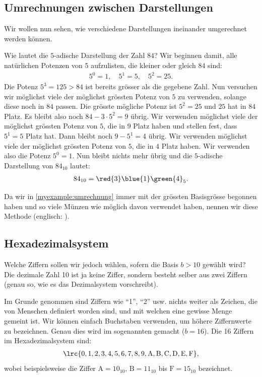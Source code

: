 \subsection{Umrechnungen zwischen Darstellungen}
Wir wollen nun sehen, wie verschiedene Darstellungen ineinander umgerechnet werden können.
\begin{myexample}\label{myexample:umrechnung}
Wie lautet die $5$-adische Darstellung der Zahl $84$? Wir beginnen damit, alle natürlichen Potenzen von $5$
aufzulisten, die kleiner oder gleich $84$ sind:
\begin{align*}
	5^0 = 1, \quad 5^1 = 5, \quad 5^2 = 25.
\end{align*}
Die Potenz $5^3 = 125 > 84$ ist bereits grösser als die gegebene Zahl. Nun versuchen wir möglichst viele der möglichst
grössten Potenz von $5$ zu verwenden, solange diese noch in $84$ passen. Die grösste mögliche Potenz ist $5^2 = 25$ und
$25$ hat  in $84$ Platz. Es bleibt also noch $84-3\cdot 5^2 = 9$ übrig. Wir verwenden möglichst viele der
möglichst grössten Potenz von $5$, die in $9$ Platz haben und stellen fest, dass $5^1=5$  Platz hat. Dann
bleibt noch $9-5^1 = 4$ übrig. Wir verwenden möglichst viele der möglichst grössten Potenz von $5$, die in $4$ Platz
haben. Wir verwenden also  die Potenz $5^0 = 1$. Nun bleibt nichts mehr übrig und die $5$-adische
Darstellung von $84_{10}$ lautet:
\begin{align*}
	84_{10} = \red{3}\blue{1}\green{4}_5.
\end{align*}
\end{myexample}
Da wir in \cref{myexample:umrechnung} immer mit der grössten Basisgrösse begonnen haben und so viele Münzen wie möglich
davon verwendet haben, nennen wir diese Methode  (englisch: ).

\subsection{Hexadezimalsystem}

Welche Ziffern sollen wir jedoch wählen, sofern die Basis $b > 10$ gewählt wird? Die dezimale Zahl 10 ist ja keine Ziffer, sondern besteht selber aus zwei Ziffern (genau so, wie es das Dezimalsystem vorschreibt).

Im Grunde genommen sind Ziffern wie \enquote{1}, \enquote{2} usw. nichts weiter als Zeichen, die von Menschen definiert worden sind, und mit welchen eine gewisse Menge gemeint ist. Wir können einfach Buchstaben verwenden, um höhere Ziffernwerte zu bezeichnen. Genau dies wird im sogenannten  gemacht ($b=16$). Die 16 Ziffern im Hexadezimalsystem sind:
\begin{align*}
	\lrc{0, 1, 2, 3, 4, 5, 6, 7, 8, 9, \text{A}, \text{B}, \text{C}, \text{D}, \text{E}, \text{F}},
\end{align*}
wobei beispielsweise die Ziffer $\text{A} = 10_{10}$, $\text{B} = 11_{10}$ bis $\text{F} = 15_{10}$ bezeichnet.

